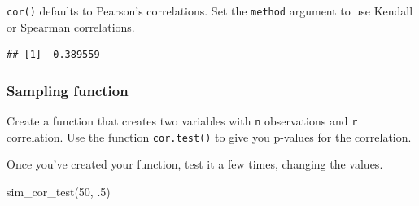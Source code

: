 \documentclass[
  oneside]{book}
\newenvironment{Shaded}{\begin{snugshade}}{\end{snugshade}}
\newcommand{\AttributeTok}[1]{\textcolor[rgb]{0.77,0.63,0.00}{#1}}
\newcommand{\ControlFlowTok}[1]{\textcolor[rgb]{0.13,0.29,0.53}{\textbf{#1}}}
\newcommand{\DecValTok}[1]{\textcolor[rgb]{0.00,0.00,0.81}{#1}}
\newcommand{\FunctionTok}[1]{\textcolor[rgb]{0.00,0.00,0.00}{#1}}
\newcommand{\NormalTok}[1]{#1}
\newcommand{\OtherTok}[1]{\textcolor[rgb]{0.56,0.35,0.01}{#1}}
\newcommand{\SpecialCharTok}[1]{\textcolor[rgb]{0.00,0.00,0.00}{#1}}
\newcommand{\StringTok}[1]{\textcolor[rgb]{0.31,0.60,0.02}{#1}}
\begin{document}
\texttt{cor()} defaults to Pearson's correlations. Set the \texttt{method} argument to use Kendall or Spearman correlations.

\begin{Shaded}
\end{Shaded}

\begin{verbatim}
## [1] -0.389559
\end{verbatim}

\hypertarget{sampling-cor}{%
\subsubsection{Sampling function}\label{sampling-cor}}

Create a function that creates two variables with \texttt{n} observations and \texttt{r} correlation. Use the function \texttt{cor.test()} to give you p-values for the correlation.

\begin{Shaded}
\end{Shaded}

Once you've created your function, test it a few times, changing the values.

\begin{Shaded}
\begin{Highlighting}[]
\FunctionTok{sim\_cor\_test}\NormalTok{(}\DecValTok{50}\NormalTok{, .}\DecValTok{5}\NormalTok{)}
\end{Highlighting}
\end{Shaded}
\end{document}
